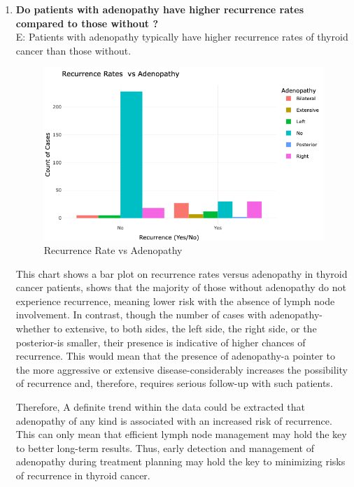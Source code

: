 \documentclass[12pt]{article}
\begin{document}
\begin{enumerate}
\newpage


       \item \textbf{Do patients with adenopathy have higher recurrence rates compared to those without ?} \\
       E: Patients with adenopathy typically have higher recurrence rates of thyroid cancer than those without.

 \begin{figure}[h]
        \vspace{5pt}
        \centering
        \includegraphics[width=1\textwidth]{recc vs adpt.png}  
        \caption{Recurrence Rate vs Adenopathy}
            \label{fig:example}
       \vspace{0.5cm}
    \end{figure}

This chart shows a bar plot on recurrence rates versus adenopathy in thyroid cancer patients, shows that the majority of those without adenopathy do not experience recurrence, meaning lower risk with the absence of lymph node involvement. In contrast, though the number of cases with adenopathy-whether to extensive, to both sides, the left side, the right side, or the posterior-is smaller, their presence is indicative of higher chances of recurrence. This would mean that the presence of adenopathy-a pointer to the more aggressive or extensive disease-considerably increases the possibility of recurrence and, therefore, requires serious follow-up with such patients.

Therefore, A definite trend within the data could be extracted that adenopathy of any kind is associated with an increased risk of recurrence. This can only mean that efficient lymph node management may hold the key to better long-term results. Thus, early detection and management of adenopathy during treatment planning may hold the key to minimizing risks of recurrence in thyroid cancer. 
    

\end{enumerate}
\end{document}
